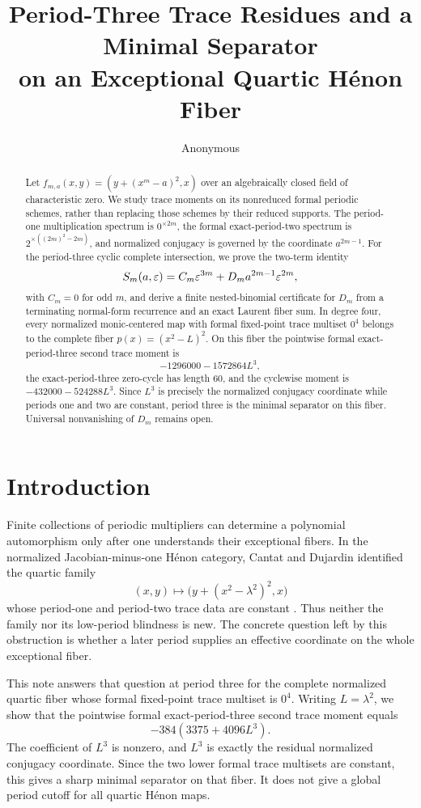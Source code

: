 \documentclass[11pt]{article}
\title{Period-Three Trace Residues and a Minimal Separator\\
on an Exceptional Quartic H\'enon Fiber}
\author{Anonymous}
\date{}
\theoremstyle{definition}
\theoremstyle{remark}
\begin{document}
\maketitle

\begin{abstract}
Let
\(
f_{m,a}(x,y)=(y+(x^m-a)^2,x)
\)
over an algebraically closed field of characteristic zero.  We study trace
moments on its nonreduced formal periodic schemes, rather than replacing
those schemes by their reduced supports.  The period-one multiplication
spectrum is \(0^{\times 2m}\), the formal exact-period-two spectrum is
\(2^{\times((2m)^2-2m)}\), and normalized conjugacy is governed by the
coordinate \(a^{2m-1}\).  For the period-three cyclic complete intersection,
we prove the two-term identity
\[
S_m(a,\varepsilon)=C_m\varepsilon^{3m}+D_m a^{2m-1}\varepsilon^{2m},
\]
with \(C_m=0\) for odd \(m\), and derive a finite nested-binomial certificate
for \(D_m\) from a terminating normal-form recurrence and an exact Laurent
fiber sum.  In degree four, every normalized monic-centered map with formal
fixed-point trace multiset \(0^4\) belongs to the complete fiber
\(p(x)=(x^2-L)^2\).  On this fiber the pointwise formal exact-period-three
second trace moment is
\[
-1296000-1572864L^3,
\]
the exact-period-three zero-cycle has length \(60\), and the cyclewise moment
is \(-432000-524288L^3\).  Since \(L^3\) is precisely the normalized
conjugacy coordinate while periods one and two are constant, period three is
the minimal separator on this fiber.  Universal nonvanishing of \(D_m\)
remains open.
\end{abstract}

\section{Introduction}
\label{sec:introduction}

Finite collections of periodic multipliers can determine a polynomial
automorphism only after one understands their exceptional fibers.  In the
normalized Jacobian-minus-one H\'enon category, Cantat and Dujardin identified
the quartic family
\[
(x,y)\longmapsto \bigl(y+(x^2-\lambda^2)^2,x\bigr)
\]
whose period-one and period-two trace data are constant
\citep{CantatDujardin2026}.  Thus neither the family nor its
low-period blindness is new.  The concrete question left by this obstruction
is whether a later period supplies an effective coordinate on the whole
exceptional fiber.

This note answers that question at period three for the complete normalized
quartic fiber whose formal fixed-point trace multiset is \(0^4\).  Writing
\(L=\lambda^2\), we show that the pointwise formal exact-period-three second
trace moment equals
\[
-384(3375+4096L^3).
\]
The coefficient of \(L^3\) is nonzero, and \(L^3\) is exactly the residual
normalized conjugacy coordinate.  Since the two lower formal trace multisets
are constant, this gives a sharp minimal separator on that fiber.  It does
not give a global period cutoff for all quartic H\'enon maps.
\end{document}
